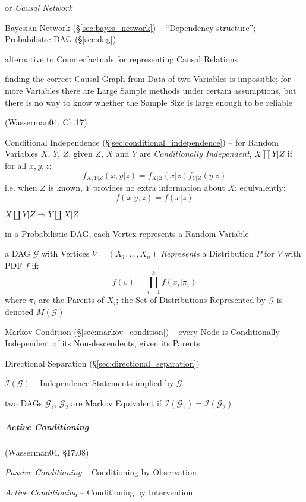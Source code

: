or \emph{Causal Network}

\fist Bayesian Network (\S\ref{sec:bayes_network}) -- ``Dependency structure'';
Probabilistic DAG (\S\ref{sec:dag})

alternative to Counterfactuals for representing Causal Relations

finding the correct Causal Graph from Data of two Variables is impossible; for
more Variables there are Large Sample methods under certain assumptions, but
there is no way to know whether the Sample Size is large enough to be reliable

(Wasserman04, Ch.17)

Conditional Independence (\S\ref{sec:conditional_independence}) -- for Random
Variables $X$, $Y$, $Z$, given $Z$, $X$ and $Y$ are \emph{Conditionally
  Independent}, $X \coprod Y | Z$ if for all $x,y,z$:
\[
  f_{X,Y|Z}(x,y|z) = f_{X|Z}(x|z) f_{Y|Z}(y|z)
\]
i.e. when $Z$ is known, $Y$ provides no extra information about $X$;
equivalently:
\[
  f(x|y, z) = f(x|z)
\]

$X \coprod Y | Z \Rightarrow Y \coprod X | Z$

in a Probabilistic DAG, each Vertex represents a Random Variable

a DAG $\mathcal{G}$ with Vertices $V = (X_1, \ldots, X_n)$ \emph{Represents} a
Distribution $P$ for $V$ with PDF $f$ if:
\[
  f(v) = \prod_{i=1}^k f(x_i | \pi_i)
\]
where $\pi_i$ are the Parents of $X_i$; the Set of Distributions Represented by
$\mathcal{G}$ is denoted $M(\mathcal{G})$

Markov Condition (\S\ref{sec:markov_condition}) -- every Node is Conditionally
Independent of its Non-descendents, given its Parents

Directional Separation (\S\ref{sec:directional_separation})

$\mathcal{I}(\mathcal{G})$ -- Independence Statements implied by $\mathcal{G}$

two DAGs $\mathcal{G}_1$, $\mathcal{G}_2$ are Markov Equivalent if
$\mathcal{I}(\mathcal{G}_1) = \mathcal{I}(\mathcal{G}_2)$



\subparagraph{Active Conditioning}\label{sec:active_conditioning}\hfill

(Wasserman04, \S17.08)

\emph{Passive Conditioning} -- Conditioning by Observation

\emph{Active Conditioning} -- Conditioning by Intervention



